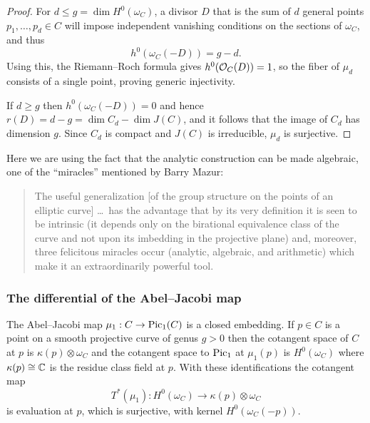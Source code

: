 \begin{proof}
For $d\leq g = \dim H^{0}(\omega_{C})$,  a divisor $D$ that is the sum of $d$ general points $p_{1}, \dots,  p_{d} \in C$ will impose independent vanishing conditions on the sections of $\omega_{C}$, and thus
$$
h^0(\omega_C(-D)) = g-d.
$$
 Using this, the 
%
Riemann--Roch formula
gives $h^{0}({\mathcal O}_{C}(D)) = 1$, so the fiber of 
$\mu_{d}$ consists of a single point, proving generic injectivity.

If $d \geq g$ then $h^0(\omega_C(-D)) = 0$ and hence $r(D) = d-g= \dim C_{d} - \dim J(C)$, and it follows that the image of $C_d$ has dimension $g$. Since $C_d$ is compact and $J(C)$ is irreducible, $\mu_{d}$ is surjective.
\end{proof}

Here we are using the fact that the analytic construction can be made algebraic, one of the ``miracles''
mentioned by 
Barry Mazur:
%
\begin{quote}
The useful generalization [of the group structure on the points of an 
\null elliptic curve]
\dots\ has the advantage that by its
very definition it is seen to be intrinsic (it depends only on the birational
equivalence class of the curve and not upon its imbedding in the projective
plane) and, moreover, three felicitous miracles occur (analytic, algebraic, and
arithmetic) which make it an extraordinarily powerful tool. 
\\
\vrule width0pt\hfill \null\emdash  \cite{MazurBulletin}
\end{quote}

\subsubsection*{The differential of the Abel--Jacobi map}

\begin{theorem}
The Abel--Jacobi map 
%
$\mu_{1}: C\to \operatorname{Pic}_{1}(C)$ is a closed embedding.  
If $p\in C$ is a point on a smooth projective curve of genus $g>0$ then the 
%
cotangent space
of $C$
at $p$ is $\kappa(p) \otimes \omega_{C}$ and the cotangent space to $\operatorname{Pic}_{1}$ at $\mu_{1}(p)$ is
$H^{0}(\omega_{C})$ where $\kappa(p) \cong {\mathbb C}$ is the residue class
field at $p$. With these identifications the 
cotangent map
%
$$
T^{*}(\mu_{1}): H^{0}(\omega_{C})  \to \kappa(p) \otimes \omega_{C}
$$
is evaluation at $p$, which is surjective, with kernel 
$H^{0}(\omega_{C}(-p))$. 
\end{theorem}


